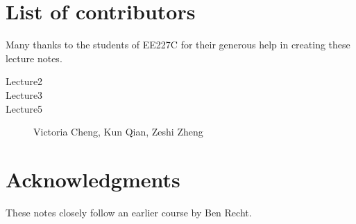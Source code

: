 \section{List of contributors}

Many thanks to the students of EE227C for their generous help in creating these
lecture notes.

\begin{description}
\item[Lecture2]
\item[Lecture3]
\item[Lecture5] Victoria Cheng, Kun Qian, Zeshi Zheng
\end{description}

\section{Acknowledgments}

These notes closely follow an earlier course by Ben Recht.
